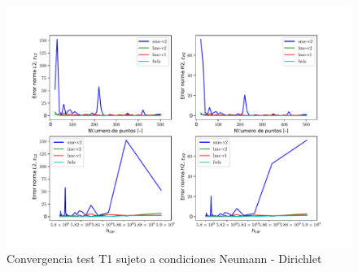 \begin{figure}
    \centering
    \includegraphics[width=1\textwidth]{./Imagenes/06/comparacion_shp_irreg/T2_irreg_type-2_caso-3_direct_dgesv-lapack-blas_sme-v2_lme-v2_lme-v1_fwls.pdf}
    \caption{Convergencia test T1 sujeto a condiciones Neumann - Dirichlet} \label{fig:T2_caso-3_conv_irreg}
\end{figure}


